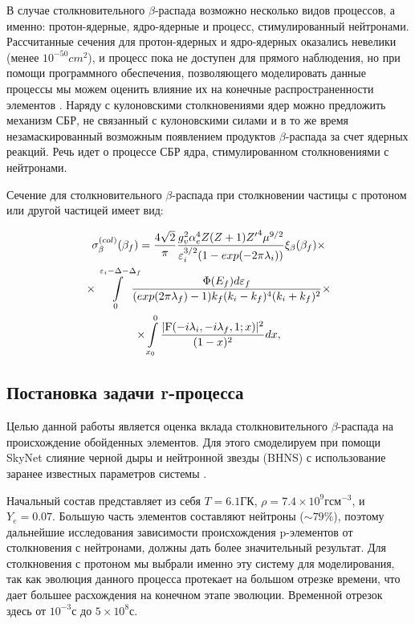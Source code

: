 \documentclass[14pt, a4paper]{article}
\numberwithin{figure}{section}
\numberwithin{equation}{section}
\begin{document}
В случае столкновительного $\beta$-распада возможно несколько видов процессов, а именно: протон-ядерные, ядро-ядерные и процесс, стимулированный нейтронами. Рассчитанные сечения для протон-ядерных и ядро-ядерных оказались невелики (менее $10^{-50}cm^2$), и процесс пока не доступен для прямого наблюдения, но при помощи программного обеспечения, позволяющего моделировать данные процессы мы можем оценить влияние их на конечные распространенности элементов \cite{tak_article}. Наряду с кулоновскими столкновениями ядер можно предложить механизм СБР, не связанный с кулоновскими силами и в то же время незамаскированный возможным появлением продуктов $\beta$-распада за счет ядерных реакций. Речь идет о процессе СБР ядра, стимулированном столкновениями с нейтронами.

Сечение для столкновительного $\beta$-распада при столкновении частицы с протоном или другой частицей имеет вид:

\begin{multline} \label{sech}
\sigma^{(col)}_\beta(\beta_f)=
{4\sqrt{2}\over \pi} {{g^2_v\alpha_e^4Z (Z+1) {Z'}^4 \mu^{9/2}}
	\over{\varepsilon_i^{3/2} (1-exp(-2\pi\lambda_i))}}
\xi_\beta(\beta_f)
\times\\
\times\int\limits_0^{\varepsilon_i{-}\Delta{-}\Delta_f}\!\!\!\!\!
{{\Phi(E_f) d\varepsilon_f}\over{(exp(2\pi\lambda_f)-1)
		k_f ( k_i- k_f)^4(k_i+k_f)^2}}\times\\
\times\int\limits_{x_0}^0 {{|{\rm F}(-i \lambda_i, -i\lambda_f,1; x)|^2}\over{(1-x)^2}} dx,
\end{multline}

\subsection{Постановка задачи r-процесса}

Целью данной работы является оценка вклада столкновительного $\beta$-распада на происхождение обойденных элементов. Для этого смоделируем при помощи SkyNet слияние черной дыры и нейтронной звезды (BHNS) с использование заранее известных параметров системы \cite{bhns}.

Начальный состав представляет из себя $T = 6.1 \text{ГК}$, $\rho = 7.4 \times 10^9 \text{г} \text{см}^{-3}$, и $Y_e = 0.07$. Большую часть элементов составляют нейтроны ($\sim 79 \%$), поэтому дальнейшие исследования зависимости происхождения p-элементов от столкновения с нейтронами, должны дать более значительный результат. Для столкновения с протоном мы выбрали именно эту систему для моделирования, так как эволюция данного процесса протекает на большом отрезке времени, что дает большее расхождения на конечном этапе эволюции. Временной отрезок здесь от $10^{-3}\text{с}$ до $5\times10^8\text{с}$.
\end{document}

